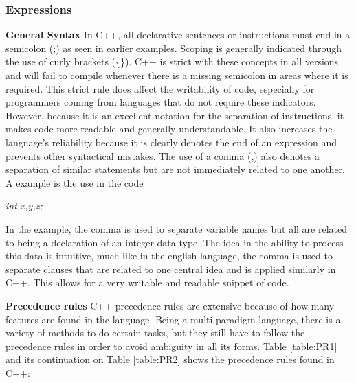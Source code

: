 \documentclass[12pt]{article}
\begin{document}
\subsubsection{Expressions}
\textbf{General Syntax} In C++, all declarative sentences or instructions must end in a semicolon (;) as seen in earlier examples. Scoping is generally indicated through the use of curly brackets (\{\}). C++ is strict with these concepts in all versions and will fail to compile whenever there is a missing semicolon in areas where it is required. This strict rule does affect the writability of code, especially for programmers coming from languages that do not require these indicators. However, because it is an excellent notation for the separation of instructions, it makes code more readable and generally understandable. It also increases the language's reliability because it is clearly denotes the end of an expression and prevents other syntactical mistakes. The use of a comma (,) also denotes a separation of similar statements but are not immediately related to one another. A example is the use in the code
\begin{center}
  \textit{int x,y,z;}
\end{center} 
In the example, the comma is used to separate variable names but all are related to being a declaration of an integer data type. The idea in the ability to process this data is intuitive, much like in the english language, the comma is used to separate clauses that are related to one central idea and is applied similarly in C++. This allows for a very writable and readable snippet of code.

\textbf{Precedence rules} C++ precedence rules are extensive because of how many features are found in the language. Being a multi-paradigm language, there is a variety of methods to do certain tasks, but they still have to follow the precedence rules in order to avoid ambiguity in all its forms. Table \ref{table:PR1} and its continuation on Table \ref{table:PR2} shows the precedence rules found in C++:
\end{document}
